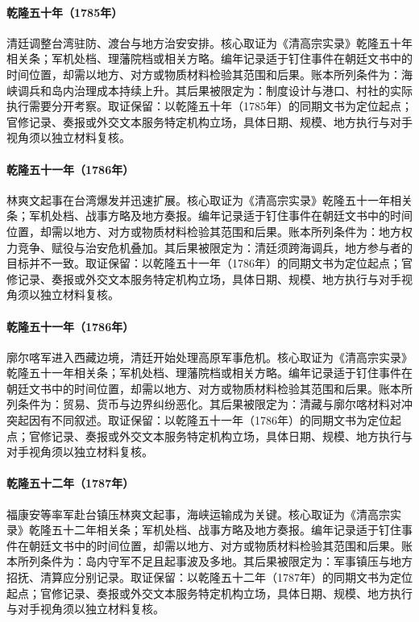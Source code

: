 \hypertarget{ledger:EQ-1785-TAIWAN-GARRISON}{}\paragraph{乾隆五十年（1785年）}清廷调整台湾驻防、渡台与地方治安安排。核心取证为《清高宗实录》乾隆五十年相关条；军机处档、理藩院档或相关方略。编年记录适于钉住事件在朝廷文书中的时间位置，却需以地方、对方或物质材料检验其范围和后果。账本所列条件为：海峡调兵和岛内治理成本持续上升。其后果被限定为：制度设计与港口、村社的实际执行需要分开考察。取证保留：以乾隆五十年（1785年）的同期文书为定位起点；官修记录、奏报或外交文本服务特定机构立场，具体日期、规模、地方执行与对手视角须以独立材料复核。
\hypertarget{ledger:EQ-1786-LIN-SHUANGWEN-UPRISING}{}\paragraph{乾隆五十一年（1786年）}林爽文起事在台湾爆发并迅速扩展。核心取证为《清高宗实录》乾隆五十一年相关条；军机处档、战事方略及地方奏报。编年记录适于钉住事件在朝廷文书中的时间位置，却需以地方、对方或物质材料检验其范围和后果。账本所列条件为：地方权力竞争、赋役与治安危机叠加。其后果被限定为：清廷须跨海调兵，地方参与者的目标并不一致。取证保留：以乾隆五十一年（1786年）的同期文书为定位起点；官修记录、奏报或外交文本服务特定机构立场，具体日期、规模、地方执行与对手视角须以独立材料复核。
\hypertarget{ledger:EQ-1786-FIRST-GURKHA-WAR}{}\paragraph{乾隆五十一年（1786年）}廓尔喀军进入西藏边境，清廷开始处理高原军事危机。核心取证为《清高宗实录》乾隆五十一年相关条；军机处档、理藩院档或相关方略。编年记录适于钉住事件在朝廷文书中的时间位置，却需以地方、对方或物质材料检验其范围和后果。账本所列条件为：贸易、货币与边界纠纷恶化。其后果被限定为：清藏与廓尔喀材料对冲突起因有不同叙述。取证保留：以乾隆五十一年（1786年）的同期文书为定位起点；官修记录、奏报或外交文本服务特定机构立场，具体日期、规模、地方执行与对手视角须以独立材料复核。
\hypertarget{ledger:EQ-1787-TAIWAN-CAMPAIGN}{}\paragraph{乾隆五十二年（1787年）}福康安等率军赴台镇压林爽文起事，海峡运输成为关键。核心取证为《清高宗实录》乾隆五十二年相关条；军机处档、战事方略及地方奏报。编年记录适于钉住事件在朝廷文书中的时间位置，却需以地方、对方或物质材料检验其范围和后果。账本所列条件为：岛内守军不足且起事波及多地。其后果被限定为：军事镇压与地方招抚、清算应分别记录。取证保留：以乾隆五十二年（1787年）的同期文书为定位起点；官修记录、奏报或外交文本服务特定机构立场，具体日期、规模、地方执行与对手视角须以独立材料复核。
